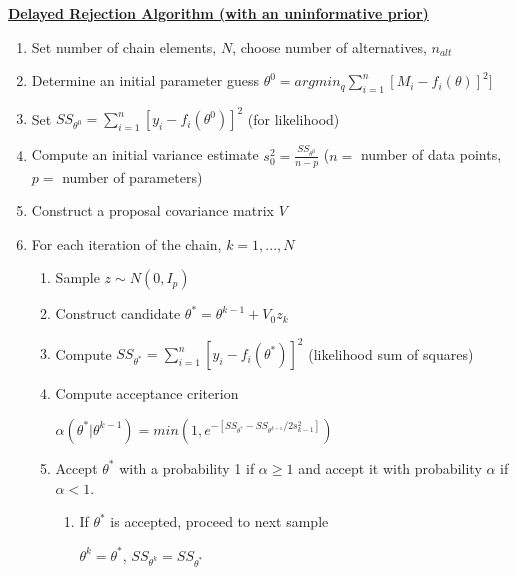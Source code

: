\documentclass{article}
\begin{document}
\begin{tcolorbox} 
\textbf{\underline{Delayed Rejection Algorithm (with an uninformative prior)}}
\begin{enumerate}

\item Set number of chain elements, $N$, choose number of alternatives, $n_{alt}$
    \item Determine an initial parameter guess $\theta^0 = argmin_q \sum_{i=1}^{n}[M_i - f_i(\theta)]^2]$
    \item Set $SS_{\theta^0} = \sum_{i = 1}^{n}[y_i - f_i(\theta^0)]^2$ (for likelihood)
    \item Compute an initial variance estimate $s_0^2 = \frac{SS_{\theta^0}}{n-p}$ ($n =$ number of data points, $p = $ number of parameters)
    \item Construct a proposal covariance matrix $V$ 
    \item For each iteration of the chain, $k = 1,...,N$
    \begin{enumerate}
        \item Sample $z \sim N(0,I_p)$ 
        \item Construct candidate $\theta^* = \theta^{k-1}+ V_0z_k$
        
        \item Compute $SS_{\theta^*} = \sum_{i = 1}^{n}[y_i - f_i(\theta^*)]^2$ (likelihood sum of squares)
        \item Compute acceptance criterion
            \begin{center}
                $\alpha(\theta^* | \theta^{k-1}) = min(1, e^{-[SS_{\theta^*}-SS_{\theta^{k-1}}/2s_{k-1}^2]})$
            \end{center}
        \item Accept $\theta^*$ with a probability 1 if $\alpha \geq 1$ and accept it with probability $\alpha$ if $\alpha < 1$.
        \begin{enumerate}
            \item If $\theta^*$ is accepted, proceed to next sample
            \begin{center}
                $\theta^k = \theta^*$, $SS_{\theta^k} = SS_{\theta^*}$
            \end{center}
            \begin{tcolorbox}[colback=red!5,colframe=red!75!black,title=Delayed Rejection]
        

\end{tcolorbox}
\end{enumerate}
\end{enumerate}
\end{enumerate}
\end{tcolorbox}
\end{document}
